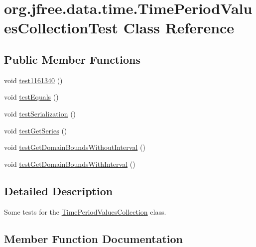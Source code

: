 \hypertarget{classorg_1_1jfree_1_1data_1_1time_1_1_time_period_values_collection_test}{}\section{org.\+jfree.\+data.\+time.\+Time\+Period\+Values\+Collection\+Test Class Reference}
\label{classorg_1_1jfree_1_1data_1_1time_1_1_time_period_values_collection_test}
\subsection*{Public Member Functions}
\begin{DoxyCompactItemize}
\item 
void \mbox{\hyperlink{classorg_1_1jfree_1_1data_1_1time_1_1_time_period_values_collection_test_a9226d7f92934da9b284f85749ec973ac}{test1161340}} ()
\item 
void \mbox{\hyperlink{classorg_1_1jfree_1_1data_1_1time_1_1_time_period_values_collection_test_a11f4d5461393a6c0f1fc019b11003e8d}{test\+Equals}} ()
\item 
void \mbox{\hyperlink{classorg_1_1jfree_1_1data_1_1time_1_1_time_period_values_collection_test_ae8bd14f6b8004a7a6d73b0cd50b0493b}{test\+Serialization}} ()
\item 
void \mbox{\hyperlink{classorg_1_1jfree_1_1data_1_1time_1_1_time_period_values_collection_test_aaef1df712ed713dab2bbd1db33894477}{test\+Get\+Series}} ()
\item 
void \mbox{\hyperlink{classorg_1_1jfree_1_1data_1_1time_1_1_time_period_values_collection_test_a522dbe286fa76bc31e2b6024a1ab7c39}{test\+Get\+Domain\+Bounds\+Without\+Interval}} ()
\item 
void \mbox{\hyperlink{classorg_1_1jfree_1_1data_1_1time_1_1_time_period_values_collection_test_ad79fee48874083debeec969ae68ff738}{test\+Get\+Domain\+Bounds\+With\+Interval}} ()
\end{DoxyCompactItemize}


\subsection{Detailed Description}
Some tests for the \mbox{\hyperlink{classorg_1_1jfree_1_1data_1_1time_1_1_time_period_values_collection}{Time\+Period\+Values\+Collection}} class. 

\subsection{Member Function Documentation}
\mbox{\label{classorg_1_1jfree_1_1data_1_1time_1_1_time_period_values_collection_test_a9226d7f92934da9b284f85749ec973ac}} 

